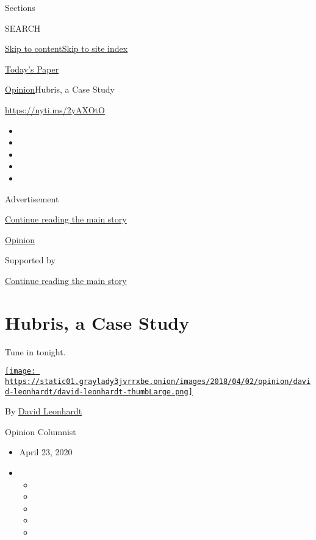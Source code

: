 Sections

SEARCH

\protect\hyperlink{site-content}{Skip to
content}\protect\hyperlink{site-index}{Skip to site index}

\href{https://myaccount.nytimes3xbfgragh.onion/auth/login?response_type=cookie\&client_id=vi}{}

\href{https://www.nytimes3xbfgragh.onion/section/todayspaper}{Today's
Paper}

\href{/section/opinion}{Opinion}\textbar{}Hubris, a Case Study

\url{https://nyti.ms/2yAXOtO}

\begin{itemize}
\item
\item
\item
\item
\item
\end{itemize}

Advertisement

\protect\hyperlink{after-top}{Continue reading the main story}

\href{/section/opinion}{Opinion}

Supported by

\protect\hyperlink{after-sponsor}{Continue reading the main story}

\hypertarget{hubris-a-case-study}{%
\section{Hubris, a Case Study}\label{hubris-a-case-study}}

Tune in tonight.

\href{https://www.nytimes3xbfgragh.onion/by/david-leonhardt}{\texttt{[image: https://static01.graylady3jvrrxbe.onion/images/2018/04/02/opinion/david-leonhardt/david-leonhardt-thumbLarge.png]}}

By \href{https://www.nytimes3xbfgragh.onion/by/david-leonhardt}{David
Leonhardt}

Opinion Columnist

\begin{itemize}
\item
  April 23, 2020
\item
  \begin{itemize}
  \item
  \item
  \item
  \item
  \item
  \end{itemize}
\end{itemize}

